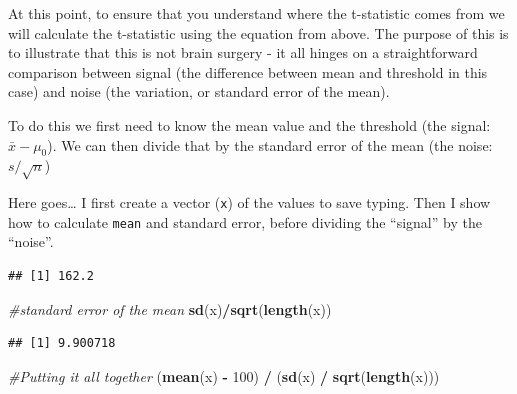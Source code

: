 \documentclass[
  a4paperpaper,
]{book}
\newenvironment{Shaded}{\begin{snugshade}}{\end{snugshade}}
\newcommand{\CommentTok}[1]{\textcolor[rgb]{0.56,0.35,0.01}{\textit{#1}}}
\newcommand{\DecValTok}[1]{\textcolor[rgb]{0.00,0.00,0.81}{#1}}
\newcommand{\KeywordTok}[1]{\textcolor[rgb]{0.13,0.29,0.53}{\textbf{#1}}}
\newcommand{\NormalTok}[1]{#1}
\newcommand{\OperatorTok}[1]{\textcolor[rgb]{0.81,0.36,0.00}{\textbf{#1}}}
\newcommand{\StringTok}[1]{\textcolor[rgb]{0.31,0.60,0.02}{#1}}
\begin{document}
At this point, to ensure that you understand where the t-statistic comes from we will calculate the t-statistic using the equation from above. The purpose of this is to illustrate that this is not brain surgery - it all hinges on a straightforward comparison between signal (the difference between mean and threshold in this case) and noise (the variation, or standard error of the mean).

To do this we first need to know the mean value and the threshold (the signal: \(\bar{x} - \mu_{0}\)). We can then divide that by the standard error of the mean (the noise: \(s/ \sqrt{n}\))

Here goes\ldots{} I first create a vector (\texttt{x}) of the values to save typing. Then I show how to calculate \texttt{mean} and standard error, before dividing the ``signal'' by the ``noise''.

\begin{Shaded}
\end{Shaded}

\begin{verbatim}
## [1] 162.2
\end{verbatim}

\begin{Shaded}
\begin{Highlighting}[]
\CommentTok{\#standard error of the mean}
\KeywordTok{sd}\NormalTok{(x)}\OperatorTok{/}\KeywordTok{sqrt}\NormalTok{(}\KeywordTok{length}\NormalTok{(x))}
\end{Highlighting}
\end{Shaded}

\begin{verbatim}
## [1] 9.900718
\end{verbatim}

\begin{Shaded}
\begin{Highlighting}[]
\CommentTok{\#Putting it all together}
\NormalTok{(}\KeywordTok{mean}\NormalTok{(x) }\OperatorTok{{-}}\StringTok{ }\DecValTok{100}\NormalTok{) }\OperatorTok{/}\StringTok{ }\NormalTok{(}\KeywordTok{sd}\NormalTok{(x) }\OperatorTok{/}\StringTok{ }\KeywordTok{sqrt}\NormalTok{(}\KeywordTok{length}\NormalTok{(x)))}
\end{Highlighting}
\end{Shaded}
\end{document}
